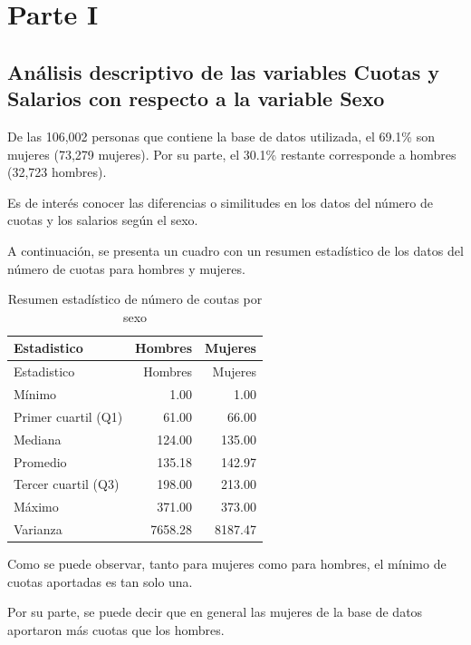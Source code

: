 \documentclass[
]{article}
\begin{document}
\hypertarget{parte-i}{%
\section{Parte I}\label{parte-i}}

\hypertarget{anuxe1lisis-descriptivo-de-las-variables-cuotas-y-salarios-con-respecto-a-la-variable-sexo}{%
\subsection{Análisis descriptivo de las variables Cuotas y Salarios con
respecto a la variable
Sexo}\label{anuxe1lisis-descriptivo-de-las-variables-cuotas-y-salarios-con-respecto-a-la-variable-sexo}}

De las 106,002 personas que contiene la base de datos utilizada, el
69.1\% son mujeres (73,279 mujeres). Por su parte, el 30.1\% restante
corresponde a hombres (32,723 hombres).

Es de interés conocer las diferencias o similitudes en los datos del
número de cuotas y los salarios según el sexo.

A continuación, se presenta un cuadro con un resumen estadístico de los
datos del número de cuotas para hombres y mujeres.

\begin{longtable}[]{@{}lrr@{}}
\caption{Resumen estadístico de número de coutas por
sexo}\tabularnewline
\toprule\noalign{}
Estadistico & Hombres & Mujeres \\
\midrule\noalign{}
\endfirsthead
\toprule\noalign{}
Estadistico & Hombres & Mujeres \\
\midrule\noalign{}
\endhead
\bottomrule\noalign{}
\endlastfoot
Mínimo & 1.00 & 1.00 \\
Primer cuartil (Q1) & 61.00 & 66.00 \\
Mediana & 124.00 & 135.00 \\
Promedio & 135.18 & 142.97 \\
Tercer cuartil (Q3) & 198.00 & 213.00 \\
Máximo & 371.00 & 373.00 \\
Varianza & 7658.28 & 8187.47 \\
\end{longtable}

Como se puede observar, tanto para mujeres como para hombres, el mínimo
de cuotas aportadas es tan solo una.

Por su parte, se puede decir que en general las mujeres de la base de
datos aportaron más cuotas que los hombres.
\end{document}
